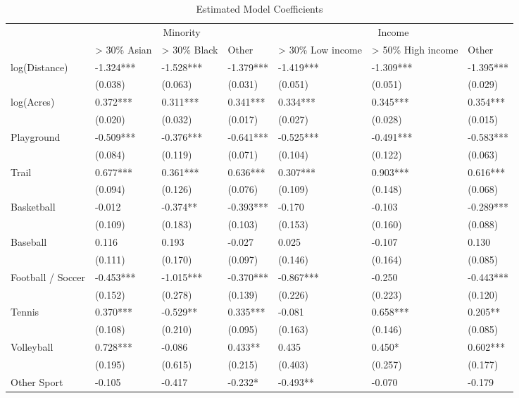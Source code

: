 \documentclass[]{elsarticle} %
\begin{document}
\begin{table}

\caption{\label{tab:grouped-modelsummary}Estimated Model Coefficients}
\centering
\begin{tabular}[t]{lllllll}
\toprule
\multicolumn{1}{c}{ } & \multicolumn{3}{c}{Minority} & \multicolumn{3}{c}{Income} \\
\cmidrule(l{3pt}r{3pt}){2-4} \cmidrule(l{3pt}r{3pt}){5-7}
  & > 30\% Asian & > 30\% Black & Other & > 30\% Low income & > 50\% High income & Other \\
\midrule
log(Distance) & -1.324*** & -1.528*** & -1.379*** & -1.419*** & -1.309*** & -1.395***\\
 & (0.038) & (0.063) & (0.031) & (0.051) & (0.051) & (0.029)\\
log(Acres) & 0.372*** & 0.311*** & 0.341*** & 0.334*** & 0.345*** & 0.354***\\
 & (0.020) & (0.032) & (0.017) & (0.027) & (0.028) & (0.015)\\
Playground & -0.509*** & -0.376*** & -0.641*** & -0.525*** & -0.491*** & -0.583***\\
 & (0.084) & (0.119) & (0.071) & (0.104) & (0.122) & (0.063)\\
Trail & 0.677*** & 0.361*** & 0.636*** & 0.307*** & 0.903*** & 0.616***\\
 & (0.094) & (0.126) & (0.076) & (0.109) & (0.148) & (0.068)\\
Basketball & -0.012 & -0.374** & -0.393*** & -0.170 & -0.103 & -0.289***\\
 & (0.109) & (0.183) & (0.103) & (0.153) & (0.160) & (0.088)\\
Baseball & 0.116 & 0.193 & -0.027 & 0.025 & -0.107 & 0.130\\
 & (0.111) & (0.170) & (0.097) & (0.146) & (0.164) & (0.085)\\
Football / Soccer & -0.453*** & -1.015*** & -0.370*** & -0.867*** & -0.250 & -0.443***\\
 & (0.152) & (0.278) & (0.139) & (0.226) & (0.223) & (0.120)\\
Tennis & 0.370*** & -0.529** & 0.335*** & -0.081 & 0.658*** & 0.205**\\
 & (0.108) & (0.210) & (0.095) & (0.163) & (0.146) & (0.085)\\
Volleyball & 0.728*** & -0.086 & 0.433** & 0.435 & 0.450* & 0.602***\\
 & (0.195) & (0.615) & (0.215) & (0.403) & (0.257) & (0.177)\\
Other Sport & -0.105 & -0.417 & -0.232* & -0.493** & -0.070 & -0.179\\

\end{tabular}
\end{table}
\end{document}
